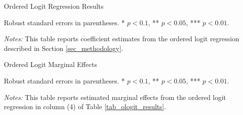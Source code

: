 \documentclass[12pt,english,hyperfootnotes=false,hidelinks]{article}
\begin{document}
\begin{table}[H]
  \centering
  \caption{Ordered Logit Regression Results}
  \vspace{0.2cm}
  \label{tab_ologit_results}
  \begin{adjustbox}{max width=\textwidth}
    \begin{threeparttable}
      \centering
      
        \begin{tablenotes}[flushleft]
        \footnotesize
        \item Robust standard errors in parentheses. * $p<0.1$, ** $p<0.05$, *** $p<0.01$.
        \item \textit{Notes:} This table reports coefficient estimates from the ordered logit regression 
        described in Section \ref{sec_methodology}.
      \end{tablenotes}
    \end{threeparttable}
  \end{adjustbox}
\end{table}

\pagebreak

\begin{table}[H]
  \centering
  \caption{Ordered Logit Marginal Effects}
  \label{tab_ologit_marginal_effects}
  \begin{adjustbox}{max width=\textwidth}
    \begin{threeparttable}
      
        \begin{tablenotes}[flushleft]\footnotesize
            \item[] \parbox[t]{\linewidth}{%
            Robust standard errors in parentheses.
            * $p<0.1$, ** $p<0.05$, *** $p<0.01$.}
        \item \textit{Notes:} This table reports estimated marginal effects from the ordered logit regression 
        in column (4) of Table \ref{tab_ologit_results}.
      \end{tablenotes}
    \end{threeparttable}
  \end{adjustbox}
\end{table}


\pagebreak

\pagebreak

\pagebreak

\appendix

\renewcommand{\thefigure}{\thesection\arabic{figure}}
\renewcommand{\thetable}{\thesection\arabic{table}}
\end{document}

